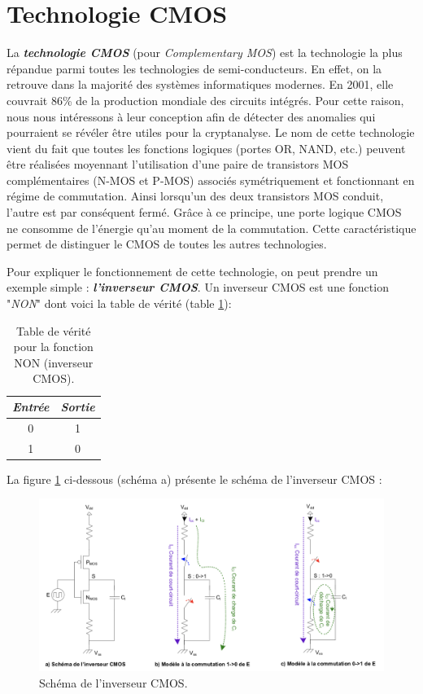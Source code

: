 \documentclass[oneside]{book}
\begin{document}
\section{Technologie CMOS}
\label{sec:CMOS}
La \textbf{\textit{technologie CMOS}} (pour \textit{Complementary MOS}) est la technologie la plus répandue parmi toutes les technologies de semi-conducteurs. En effet, on la retrouve dans la majorité des systèmes informatiques modernes. En 2001, elle couvrait 86\% de la production mondiale des circuits intégrés. Pour cette raison, nous nous intéressons à leur conception afin de détecter des anomalies qui pourraient se révéler être utiles pour la cryptanalyse. Le nom de cette technologie vient du fait que toutes les fonctions logiques (portes OR, NAND, etc.) peuvent être réalisées moyennant l’utilisation d’une paire de transistors MOS complémentaires (N-MOS et P-MOS) associés symétriquement et fonctionnant en régime de commutation. Ainsi lorsqu'un des deux transistors MOS conduit, l’autre est par conséquent fermé. Grâce à ce principe, une porte logique CMOS ne consomme de l’énergie qu’au moment de la commutation. Cette caractéristique permet de distinguer le CMOS de toutes les autres technologies.

\hspace{-0.5 cm}Pour expliquer le fonctionnement de cette technologie, on peut prendre un exemple simple : \textbf{\textit{l'inverseur CMOS}}. Un inverseur CMOS est une fonction "\textit{NON}" dont voici la table de vérité (table \ref{tab:verite}):
\begin{table}[htbp]
	\centering
	\begin{tabular}{|c|c|}
    		\hline
   		  \textit{Entrée} & \textit{Sortie} \\ \hline 
   		  0 & 1 \\ 
   		  1 & 0 \\ \hline
	\end{tabular}
    	\caption{Table de vérité pour la fonction NON (inverseur CMOS).}
    	\label{tab:verite} 
\end{table}

\hspace{-0.5 cm}La figure \ref{fig:CMOS} ci-dessous (schéma a) présente le schéma de l'inverseur CMOS :
\begin{figure}[htbp]
    \centering
    \includegraphics[scale=0.8]{image/CMOS}
    \caption{Schéma de l'inverseur CMOS.}
    \label{fig:CMOS} 
\end{figure}
\end{document}
